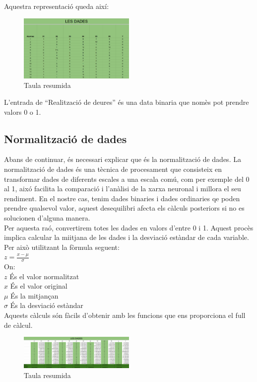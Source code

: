 Aquestra representació queda així:

\begin{figure}[H]
    \centering
    \includegraphics[width=0.5\textwidth]{./figures/Dades_resumides.png}
    \caption{Taula resumida}
\end{figure}

L'entrada de ``Realització de deures'' és una data binaria que nomès pot prendre valors 0 o 1.
\subsection{Normalització de dades}\label{subsec:24}
Abans de continuar, és necessari explicar que és la normalització de dades.
La normalització de dades és una tècnica de procesament que consisteix en transformar dades de diferents escales a una escala comú, com per exemple del 0 al 1, aixó facilita la comparació i l'anàlisi de la xarxa neuronal i millora el seu rendiment. En el nostre cas, tenim dades binaries i dades ordinaries qe poden prendre qualsevol valor, aquest desequilibri afecta els càlculs posteriors si no es solucionen d'alguna manera. \\

Per aquesta raó, convertirem totes les dades en valors d'entre 0 i 1. Aquest procès implica calcular la miitjana de les dades i la desviació estàndar de cada variable. Per això utilitzant la fòrmula seguent:\\
$z = \frac{x - \mu}{\sigma}$\\

On:\\
$z$ És el valor normalitzat\\
$x$ És el valor original\\
$\mu$ És la mitjançan\\
$\sigma$ És la desviació estàndar\\

Aquests càlculs són fàcils d'obtenir amb les funcions que ens proporciona el full de càlcul.

\begin{figure}[H]
    \centering
    \includegraphics[width=0.5\textwidth]{./figures/Dades_normalitzades.png}
    \caption{Taula resumida}
\end{figure}

